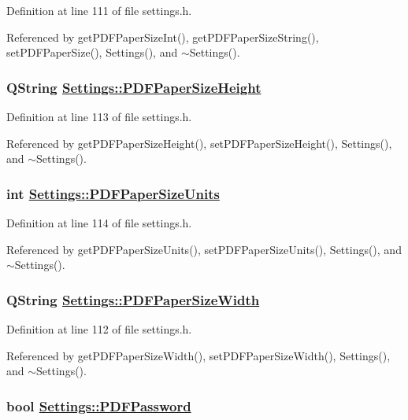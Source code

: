 Definition at line 111 of file settings.h.

Referenced by get\-PDFPaper\-Size\-Int(), get\-PDFPaper\-Size\-String(), set\-PDFPaper\-Size(), Settings(), and $\sim$Settings().\hypertarget{classSettings_r20}{
\subsubsection[PDFPaperSizeHeight]{\setlength{\rightskip}{0pt plus 5cm}QString \hyperlink{classSettings_r20}{Settings::PDFPaper\-Size\-Height}}}
\label{classSettings_r20}


Definition at line 113 of file settings.h.

Referenced by get\-PDFPaper\-Size\-Height(), set\-PDFPaper\-Size\-Height(), Settings(), and $\sim$Settings().\hypertarget{classSettings_r21}{
\subsubsection[PDFPaperSizeUnits]{\setlength{\rightskip}{0pt plus 5cm}int \hyperlink{classSettings_r21}{Settings::PDFPaper\-Size\-Units}}}
\label{classSettings_r21}


Definition at line 114 of file settings.h.

Referenced by get\-PDFPaper\-Size\-Units(), set\-PDFPaper\-Size\-Units(), Settings(), and $\sim$Settings().\hypertarget{classSettings_r19}{
\subsubsection[PDFPaperSizeWidth]{\setlength{\rightskip}{0pt plus 5cm}QString \hyperlink{classSettings_r19}{Settings::PDFPaper\-Size\-Width}}}
\label{classSettings_r19}


Definition at line 112 of file settings.h.

Referenced by get\-PDFPaper\-Size\-Width(), set\-PDFPaper\-Size\-Width(), Settings(), and $\sim$Settings().\hypertarget{classSettings_r22}{
\subsubsection[PDFPassword]{\setlength{\rightskip}{0pt plus 5cm}bool \hyperlink{classSettings_r22}{Settings::PDFPassword}}}
\label{classSettings_r22}


